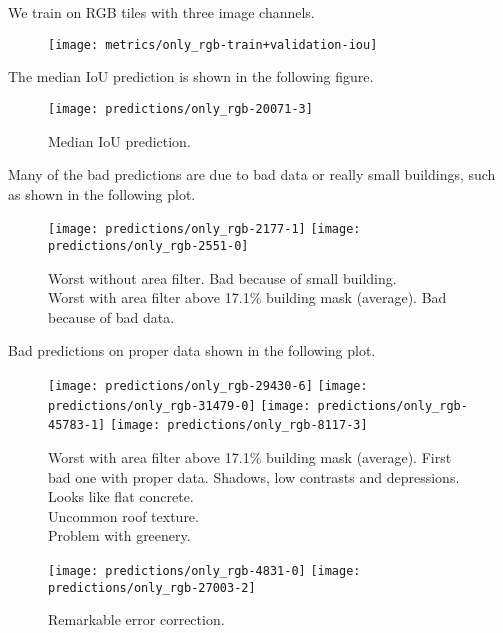 We train on RGB tiles with three image channels.

\begin{figure}[H]
  \centering
  \texttt{[image: metrics/only\_rgb-train+validation-iou]}
\end{figure}

The median IoU prediction is shown in the following figure.

\begin{figure}[H]
  \centering
  \texttt{[image: predictions/only\_rgb-20071-3]}  %
  \caption{%
    Median IoU prediction.
  }
\end{figure}

Many of the bad predictions are due to bad data or really small buildings, such as shown in the following plot.

\begin{figure}[H]
  \centering
  \texttt{[image: predictions/only\_rgb-2177-1]}  %
  \texttt{[image: predictions/only\_rgb-2551-0]}  %
  \caption{%
    Worst without area filter. Bad because of small building. \\
    Worst with area filter above 17.1\% building mask (average).
    Bad because of bad data.
  }
\end{figure}

Bad predictions on proper data shown in the following plot.

\begin{figure}[H]
  \centering
  \texttt{[image: predictions/only\_rgb-29430-6]}  %
  \texttt{[image: predictions/only\_rgb-31479-0]}  %
  \texttt{[image: predictions/only\_rgb-45783-1]}  %
  \texttt{[image: predictions/only\_rgb-8117-3]}  %
  \caption{%
    Worst with area filter above 17.1\% building mask (average).  First bad one with proper data.  Shadows, low contrasts and depressions. \\
    Looks like flat concrete. \\
    Uncommon roof texture. \\
    Problem with greenery.
  }%
  \label{fig:rgb-prediction-issues}
\end{figure}

\begin{figure}[H]
  \centering
  \texttt{[image: predictions/only\_rgb-4831-0]}  %
  \texttt{[image: predictions/only\_rgb-27003-2]}  %
  \caption{%
    Remarkable error correction. \\
  }
\end{figure}
